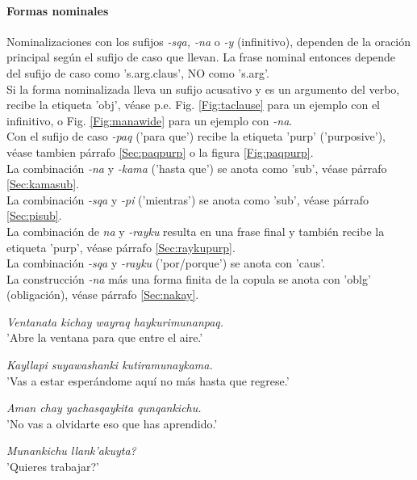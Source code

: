 \documentclass[a4paper,11pt,DIV12]{scrartcl}
\begin{document}
\paragraph{Formas nominales}\label{Sec:subordNom}
Nominalizaciones con los sufijos {\em -sqa, -na} o {\em -y} (infinitivo), dependen de la oraci\'on principal seg\'un el sufijo de caso que llevan. La frase nominal entonces depende del sufijo de caso como 's.arg.claus', NO como 's.arg'. \\
Si la forma nominalizada lleva un sufijo acusativo y es un argumento del verbo, recibe la etiqueta 'obj',
v\'ease p.e. Fig. \ref{Fig:taclause} para un ejemplo con el infinitivo, o Fig. \ref{Fig:manawide} para un ejemplo con {\em -na}.\\
Con el sufijo de caso {\em -paq} ('para que') recibe la etiqueta 'purp' ('purposive'), v\'ease tambien p\'arrafo \ref{Sec:paqpurp} o la figura \ref{Fig:paqpurp}.\\
La combinaci\'on {\em -na} y {\em -kama} ('hasta que') se anota como 'sub', v\'ease p\'arrafo \ref{Sec:kamasub}.\\
La combinaci\'on {\em -sqa} y {\em -pi} ('mientras') se anota como 'sub', v\'ease p\'arrafo \ref{Sec:pisub}.\\
La combinaci\'on de {\em na} y {\em -rayku} resulta en una frase final y tambi\'en recibe la etiqueta 'purp', v\'ease p\'arrafo \ref{Sec:raykupurp}.\\
La combinaci\'on {\em -sqa} y {\em -rayku} ('por/porque') se anota con 'caus'.\\
La construcci\'on {\em -na} m\'as una forma finita de la copula se anota con 'oblg' (obligaci\'on), v\'ease p\'arrafo \ref{Sec:nakay}.

\begin{examples}
 \item {\em Ventanata kichay wayraq haykurimunanpaq.}\\
      'Abre la ventana para que entre el aire.'
 \item {\em Kayllapi suyawashanki kutiramunaykama.}\\
      'Vas a estar esper\'andome aqu\'i no m\'as hasta que regrese.'
 \item {\em Aman chay yachasqaykita qunqankichu.}\\
      'No vas a olvidarte eso que has aprendido.'
 \item {\em Munankichu llank'akuyta?}\\
      '{\textquestiondown}Quieres trabajar?'\\
 	\hfill{\small \citep[209-214]{Cusi2}}
\end{examples}
\end{document}
